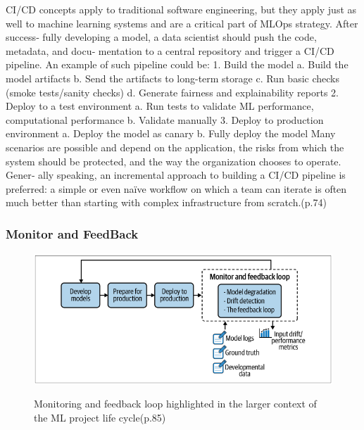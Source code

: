 CI/CD concepts apply to traditional software engineering, but they apply just as well
to machine learning systems and are a critical part of MLOps strategy. After success‐
fully developing a model, a data scientist should push the code, metadata, and docu‐
mentation to a central repository and trigger a CI/CD pipeline. An example of such
pipeline could be:
1. Build the model
a. Build the model artifacts
b. Send the artifacts to long-term storage
c. Run basic checks (smoke tests/sanity checks)
d. Generate fairness and explainability reports
2. Deploy to a test environment
a. Run tests to validate ML performance, computational performance
b. Validate manually
3. Deploy to production environment
a. Deploy the model as canary
b. Fully deploy the model
Many scenarios are possible and depend on the application, the risks from which the
system should be protected, and the way the organization chooses to operate. Gener‐
ally speaking, an incremental approach to building a CI/CD pipeline is preferred: a
simple or even naïve workflow on which a team can iterate is often much better than
starting with complex infrastructure from scratch.\cite{treveil2020introducing}(p.74)

\subsubsection{Monitor and FeedBack}

\begin{figure}[!htbp]
    \caption{Monitoring and feedback loop highlighted in the larger context of the ML
    project life cycle\cite{treveil2020introducing}(p.85)}
    \centering
    \includegraphics[scale=0.5]{images/monitor-intro}
    \label{fig:monitor-intro}
\end{figure}

